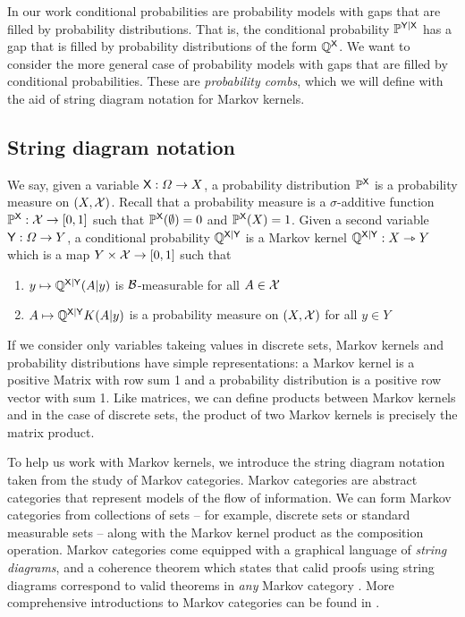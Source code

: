 In our work conditional probabilities are probability models with gaps that are filled by probability distributions. That is, the conditional probability $\mathbb{P}^{\mathsf{Y}|\mathsf{X}}$ has a gap that is filled by probability distributions of the form $\mathbb{Q}^{\mathsf{X}}$. We want to consider the more general case of probability models with gaps that are filled by conditional probabilities. These are \emph{probability combs}, which we will define with the aid of string diagram notation for Markov kernels.

\subsection{String diagram notation}

We say, given a variable $\mathsf{X}:\Omega\to X$, a probability distribution $\mathbb{P}^{\mathsf{X}}$ is a probability measure on $(X,\mathcal{X})$. Recall that a probability measure is a $\sigma$-additive function $\mathbb{P}^{\mathsf{X}}:\mathcal{X}\to [0,1]$ such that $\mathbb{P}^{\mathsf{X}}(\emptyset)=0$ and $\mathbb{P}^{\mathsf{X}}(X)=1$. Given a second variable $\mathsf{Y}:\Omega\to Y$, a conditional probability $\mathbb{Q}^{\mathsf{X}|\mathsf{Y}}$ is a Markov kernel $\mathbb{Q}^{\mathsf{X}|\mathsf{Y}}:X\rightarrowtriangle Y$which is a map $Y\times \mathcal{X}\to [0,1]$ such that

\begin{enumerate}
	\item $y\mapsto \mathbb{Q}^{\mathsf{X}|\mathsf{Y}}(A|y)$ is $\mathcal{B}$-measurable for all $A\in \mathcal{X}$
	\item $A\mapsto \mathbb{Q}^{\mathsf{X}|\mathsf{Y}}{K}(A|y)$ is a probability measure on $(X,\mathcal{X})$ for all $y\in Y$
\end{enumerate}

If we consider only variables takeing values in discrete sets, Markov kernels and probability distributions have simple representations: a Markov kernel is a positive Matrix with row sum 1 and a probability distribution is a positive row vector with sum 1. Like matrices, we can define products between Markov kernels and in the case of discrete sets, the product of two Markov kernels is precisely the matrix product.

To help us work with Markov kernels, we introduce the string diagram notation taken from the study of Markov categories. Markov categories are abstract categories that represent models of the flow of information. We can form Markov categories from collections of sets -- for example, discrete sets or standard measurable sets -- along with the Markov kernel product as the composition operation. Markov categories come equipped with a graphical language of \emph{string diagrams}, and a coherence theorem which states that calid proofs using string diagrams correspond to valid theorems in \emph{any} Markov category \citep{selinger_survey_2010}. More comprehensive introductions to Markov categories can be found in \citet{fritz_synthetic_2020,cho_disintegration_2019}.

